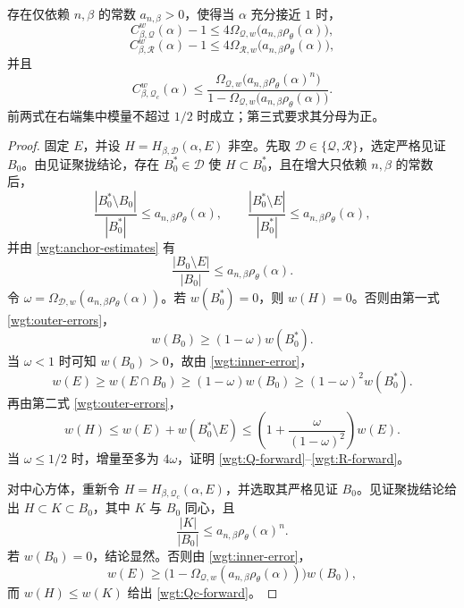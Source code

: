 \begin{theorem}[集中模量控制]\label{wgt:theorem-forward}
存在仅依赖 \(n,\beta\) 的常数 \(a_{n,\beta}>0\)，使得当 \(\alpha\) 充分接近 \(1\) 时，
\begin{equation}
 C^w_{\beta,\mathcal Q}(\alpha)-1
 \leq4\Omega_{\mathcal Q,w}\bigl(a_{n,\beta}\rho_\theta(\alpha)\bigr),
\label{wgt:Q-forward}
\end{equation}
\begin{equation}
 C^w_{\beta,\mathcal R}(\alpha)-1
 \leq4\Omega_{\mathcal R,w}\bigl(a_{n,\beta}\rho_\theta(\alpha)\bigr),
\label{wgt:R-forward}
\end{equation}
并且
\begin{equation}
 C^w_{\beta,\mathcal Q_c}(\alpha)
 \leq
 \frac{\Omega_{\mathcal Q,w}\bigl(a_{n,\beta}\rho_\theta(\alpha)^n\bigr)}
 {1-\Omega_{\mathcal Q,w}\bigl(a_{n,\beta}\rho_\theta(\alpha)\bigr)}.
\label{wgt:Qc-forward}
\end{equation}
前两式在右端集中模量不超过 \(1/2\) 时成立；第三式要求其分母为正。
\end{theorem}

\begin{proof}
固定 \(E\)，并设 \(H=H_{\beta,\mathcal D}(\alpha,E)\) 非空。先取
\(\mathcal D\in\{\mathcal Q,\mathcal R\}\)，选定严格见证 \(B_0\)。由见证聚拢结论，存在
\(B_0^\ast\in\mathcal D\) 使 \(H\subset B_0^\ast\)，且在增大只依赖 \(n,\beta\) 的常数后，
\begin{equation}
 \frac{|B_0^\ast\setminus B_0|}{|B_0^\ast|}
 \leq a_{n,\beta}\rho_\theta(\alpha),\qquad
 \frac{|B_0^\ast\setminus E|}{|B_0^\ast|}
 \leq a_{n,\beta}\rho_\theta(\alpha),
\label{wgt:outer-errors}
\end{equation}
并由 \eqref{wgt:anchor-estimates} 有
\begin{equation}
 \frac{|B_0\setminus E|}{|B_0|}
 \leq a_{n,\beta}\rho_\theta(\alpha).
\label{wgt:inner-error}
\end{equation}
令 \(\omega=\Omega_{\mathcal D,w}(a_{n,\beta}\rho_\theta(\alpha))\)。若
\(w(B_0^\ast)=0\)，则 \(w(H)=0\)。否则由第一式 \eqref{wgt:outer-errors}，
\[
 w(B_0)\geq(1-\omega)w(B_0^\ast).
\]
当 \(\omega<1\) 时可知 \(w(B_0)>0\)，故由 \eqref{wgt:inner-error}，
\[
 w(E)\geq w(E\cap B_0)\geq(1-\omega)w(B_0)
 \geq(1-\omega)^2w(B_0^\ast).
\]
再由第二式 \eqref{wgt:outer-errors}，
\[
 w(H)\leq w(E)+w(B_0^\ast\setminus E)
 \leq\left(1+\frac{\omega}{(1-\omega)^2}\right)w(E).
\]
当 \(\omega\leq1/2\) 时，增量至多为 \(4\omega\)，证明
\eqref{wgt:Q-forward}--\eqref{wgt:R-forward}。

对中心方体，重新令 \(H=H_{\beta,\mathcal Q_c}(\alpha,E)\)，并选取其严格见证 \(B_0\)。见证聚拢结论给出 \(H\subset K\subset B_0\)，其中 \(K\) 与 \(B_0\) 同心，且
\[
 \frac{|K|}{|B_0|}\leq a_{n,\beta}\rho_\theta(\alpha)^n.
\]
若 \(w(B_0)=0\)，结论显然。否则由 \eqref{wgt:inner-error}，
\[
 w(E)\geq\bigl(1-\Omega_{\mathcal Q,w}(a_{n,\beta}\rho_\theta(\alpha))\bigr)w(B_0),
\]
而 \(w(H)\leq w(K)\) 给出 \eqref{wgt:Qc-forward}。
\end{proof}


